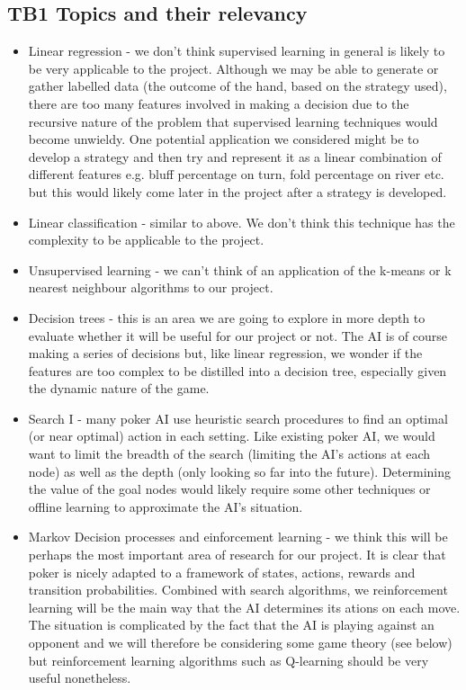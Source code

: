 \documentclass{article}
\begin{document}
\begin{multicols*}{2}
\section{TB1 Topics and their relevancy}
\begin{itemize}
    \item Linear regression - we don't think supervised learning in general is likely to be very applicable to the project. Although we may be able to generate or gather labelled data (the outcome of the hand, based on the strategy used), there are too many features involved in making a decision due to the recursive nature of the problem that supervised learning techniques would become unwieldy. One potential application we considered might be to develop a strategy and then try and represent it as a linear combination of different features e.g. bluff percentage on turn, fold percentage on river etc. but this would likely come later in the project after a strategy is developed.
    \item Linear classification - similar to above. We don't think this technique has the complexity to be applicable to the project.
    \item Unsupervised learning - we can't think of an application of the k-means or k nearest neighbour algorithms to our project.
    \item Decision trees - this is an area we are going to explore in more depth to evaluate whether it will be useful for our project or not. The AI is of course making a series of decisions but, like linear regression, we wonder if the features are too complex to be distilled into a decision tree, especially given the dynamic nature of the game. 
    \item Search I - many poker AI use heuristic search procedures to find an optimal (or near optimal) action in each setting. Like existing poker AI, we would want to limit the breadth of the search (limiting the AI's actions at each node) as well as the depth (only looking so far into the future). Determining the value of the goal nodes would likely require some other techniques or offline learning to approximate the AI's situation. 
    \item Markov Decision processes and einforcement learning - we think this will be perhaps the most important area of research for our project. It is clear that poker is nicely adapted to a framework of states, actions, rewards and transition probabilities. Combined with search algorithms, we reinforcement learning will be the main way that the AI determines its ations on each move. The situation is complicated by the fact that the AI is playing against an opponent and we will therefore be considering some game theory (see below) but reinforcement learning algorithms such as Q-learning should be very useful nonetheless.

\end{itemize}
\end{multicols*}
\end{document}
